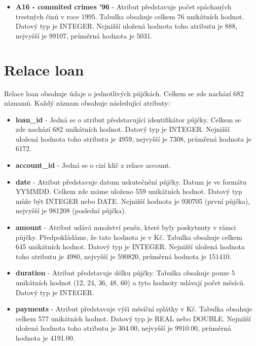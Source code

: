 \documentclass{article}
\begin{document}
\begin{itemize}
	
	\item \textbf{A16 - commited crimes '96} - Atribut představuje počet spáchaných trestných činů v roce 1995. Tabulka obsahuje celkem 76 unikátních hodnot. Datový typ je INTEGER. Nejnižší uložená hodnota toho atributu je 888, nejvyšší je 99107, průměrná hodnota je 5031.

				
\end{itemize}

\section{Relace loan}

Relace loan obsahuje údaje o jednotlivých půjčkách. Celkem se zde nachází 682 záznamů. Každý záznam obsahuje následující atributy:

\begin{itemize}

	\item \textbf{loan\_id} - Jedná se o atribut představující identifikátor půjčky. Celkem se zde nachází 682 unikátních hodnot. Datový typ je INTEGER. Nejnižší uložená hodnota toho atributu je 4959, nejvyšší je 7308, průměrná hodnota je 6172.

	
	\item \textbf{account\_id} - Jedná se o cizí klíč z relace account.
	
	\item \textbf{date} - Atribut představuje datum uskutečnění půjčky. Datum je ve formátu YYMMDD. Celkem zde máme uloženo 559 unikátních hodnot. Datový typ může být INTEGER nebo DATE. Nejnižší hodnota je 930705 (první půjčka), nejvyšší je 981208 (poslední půjčka).
	
	\item \textbf{amount} - Atribut udává množství peněz, které byly poskytnuty v rámci půjčky. Předpokládáme, že tato hodnota je v Kč. Tabulka obsahuje celkem 645 unikátních hodnot. Datový typ je INTEGER. Nejnižší uložená hodnota toho atributu je 4980, nejvyšší je 590820, průměrná hodnota je 151410.

	
	\item \textbf{duration} - Atribut představuje délku půjčky. Tabulka obsahuje pouze 5 unikátních hodnot (12, 24, 36, 48, 60) a tyto hodnoty udávají počet měsíců. Datový typ je INTEGER.
	
	\item \textbf{payments} - Atribut představuje výši měsíční splátky v Kč. Tabulka obsahuje celkem 577 unikátních hodnot. Datový typ je REAL nebo DOUBLE. Nejnižší uložená hodnota toho atributu je 304.00, nejvyšší je 9910.00, průměrná hodnota je 4191.00.
	

\end{itemize}
\end{document}
